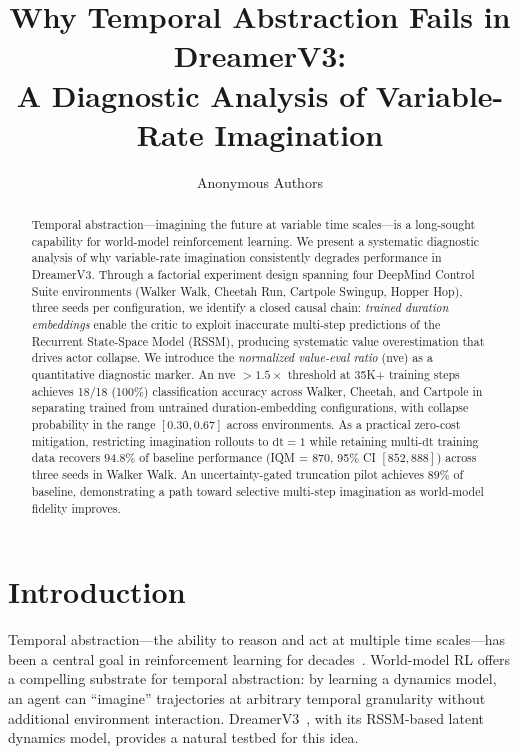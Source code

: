\documentclass[10pt,letterpaper]{article}
\title{Why Temporal Abstraction Fails in DreamerV3:\\ A Diagnostic Analysis of Variable-Rate Imagination}
\author{
  Anonymous Authors
}
\date{}
\newcommand{\dt}{\mathrm{dt}}
\begin{document}
\maketitle

\begin{abstract}
Temporal abstraction---imagining the future at variable time scales---is a long-sought capability for world-model reinforcement learning.
We present a systematic diagnostic analysis of why variable-rate imagination consistently degrades performance in DreamerV3.
Through a factorial experiment design spanning four DeepMind Control Suite environments (Walker Walk, Cheetah Run, Cartpole Swingup, Hopper Hop), three seeds per configuration, we identify a closed causal chain: \emph{trained duration embeddings} enable the critic to exploit inaccurate multi-step predictions of the Recurrent State-Space Model (RSSM), producing systematic value overestimation that drives actor collapse.
We introduce the \emph{normalized value-eval ratio} (nve) as a quantitative diagnostic marker.
An nve $> 1.5\times$ threshold at 35K+ training steps achieves 18/18 (100\%) classification accuracy across Walker, Cheetah, and Cartpole in separating trained from untrained duration-embedding configurations, with collapse probability in the range $[0.30, 0.67]$ across environments.
As a practical zero-cost mitigation, restricting imagination rollouts to $\dt=1$ while retaining multi-$\dt$ training data recovers $94.8\%$ of baseline performance (IQM = 870, 95\% CI $[852, 888]$) across three seeds in Walker Walk.
An uncertainty-gated truncation pilot achieves $89\%$ of baseline, demonstrating a path toward selective multi-step imagination as world-model fidelity improves.
\end{abstract}

\section{Introduction}

Temporal abstraction---the ability to reason and act at multiple time scales---has been a central goal in reinforcement learning for decades~\citep{sutton1999between,precup2000temporal}.
World-model RL offers a compelling substrate for temporal abstraction: by learning a dynamics model, an agent can ``imagine'' trajectories at arbitrary temporal granularity without additional environment interaction.
DreamerV3~\citep{hafner2023mastering}, with its RSSM-based latent dynamics model, provides a natural testbed for this idea.
\end{document}
